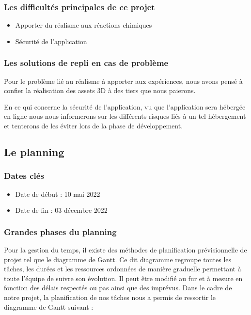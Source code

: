 \subsubsection{Les difficultés principales de ce projet}

\begin{itemize}
	\item Apporter du réalisme aux réactions chimiques
	\item Sécurité de l’application
\end{itemize}

\subsubsection{Les solutions de repli en cas de problème }

Pour le problème lié au réalisme à apporter aux expériences, nous avons pensé à confier la réalisation des assets 3D à des tiers que nous paierons.

En ce qui concerne la sécurité de l’application, vu que l’application sera hébergée en ligne nous nous informerons sur les différents risques liés à un tel hébergement et tenterons de les éviter lors de la phase de développement.

\subsection{Le planning}

\subsubsection{Dates clés}

\begin{itemize}
	\item Date de début : 10 mai 2022
	\item Date de fin :  03 décembre 2022
\end{itemize}

\subsubsection{Grandes phases du planning}

Pour la gestion du temps, il existe des méthodes de planification prévisionnelle de projet tel que le diagramme de Gantt. Ce dit diagramme regroupe toutes les tâches, les durées et les ressources ordonnées de manière graduelle permettant à toute l’équipe de suivre son évolution. Il peut être modifié au fur et à mesure en fonction des délais respectés ou pas ainsi que des imprévus. Dans le cadre de notre projet, la planification de nos tâches nous a permis de ressortir le diagramme de Gantt suivant :


